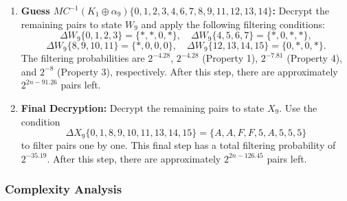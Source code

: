\documentclass[journal=tosc,preprint]{iacrtrans}
\begin{document}
\begin{enumerate}
        \item \textbf{Guess $MC^{-1}(K_1 \oplus \alpha_9)\{0, 1, 2, 3, 4, 6, 7, 8, 9, 11, 12, 13, 14\}$:}
              Decrypt the remaining pairs to state $W_9$ and apply the following filtering conditions:
              \[
                  \Delta W_9\{0, 1, 2, 3\} = \{\ast, \ast, 0, \ast\}, \quad \Delta W_9\{4, 5, 6, 7\} = \{\ast, 0, \ast, \ast\},
              \]
              \[
                  \Delta W_9\{8, 9, 10, 11\} = \{\ast, 0, 0, 0\}, \quad \Delta W_9\{12, 13, 14, 15\} = \{0, \ast, 0, \ast\}.
              \]
              The filtering probabilities are $2^{-4.28}$, $2^{-4.28}$ (Property 1), $2^{-7.81}$ (Property 4), and $2^{-8}$ (Property 3), respectively. After this step, there are approximately $2^{2n-91.26}$ pairs left.

        \item \textbf{Final Decryption:}
              Decrypt the remaining pairs to state $X_9$. Use the condition
              \[
                  \Delta X_9\{0, 1, 8, 9, 10, 11, 13, 14, 15\} = \{A, A, F, F, 5, A, 5, 5, 5\}
              \]
              to filter pairs one by one. This final step has a total filtering probability of $2^{-35.19}$. After this step, there are approximately $2^{2n-126.45}$ pairs left.
    \end{enumerate}


    \subsubsection{Complexity Analysis}
\end{document}

